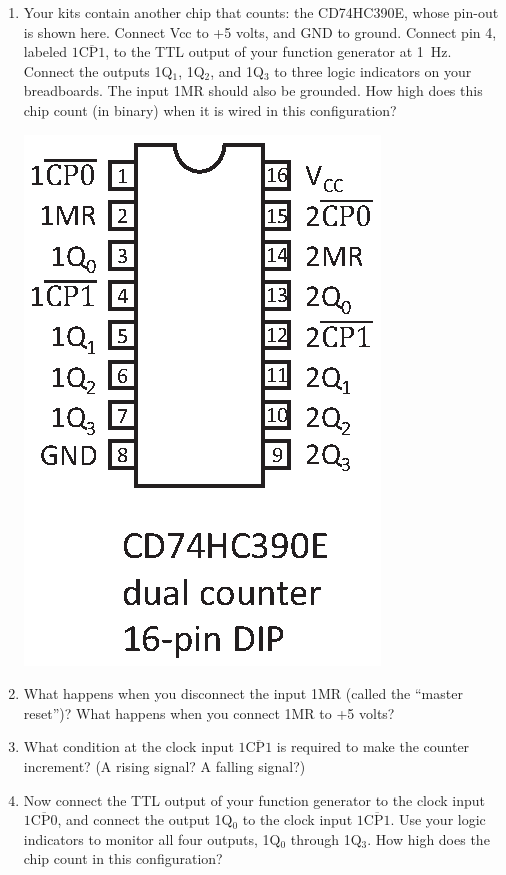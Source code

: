\begin{enumerate}
\item Your kits contain another chip that counts: the CD74HC390E, whose pin-out is shown here.  Connect Vcc to +5 volts, and GND to ground.  Connect pin 4, labeled $1\mathrm{\overline{CP1}}$, to the TTL output of your function generator at 1~Hz.  Connect the outputs 1Q$_1$, 1Q$_2$, and 1Q$_3$ to three logic indicators on your breadboards.  The input 1MR should also be grounded.  How high does this chip count (in binary) when it is wired in this configuration?  

\vspace{-0.2in}
\begin{center}
\includegraphics[scale=0.8]{appendices/pinouts/cd74hc390e.eps}
\end{center}
\vspace{-0.1in}

\item What happens when you disconnect the input 1MR (called the ``master reset'')?  What happens when you connect 1MR to +5 volts?

\item What condition at the clock input $1\mathrm{\overline{CP1}}$ is required to make the counter increment?  (A rising signal?  A falling signal?)

\item Now connect the TTL output of your function generator to the clock input $1\mathrm{\overline{CP0}}$, and connect the output 1Q$_0$ to the clock input $1\mathrm{\overline{CP1}}$.  Use your logic indicators to monitor all four outputs, 1Q$_0$ through 1Q$_3$.  How high does the chip count in this configuration?  


\end{enumerate}
